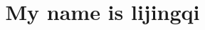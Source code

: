 \documentclass[12pt]{article}
\begin{document}
\title{My name is lijingqi}
\titlemake
\end{document}
